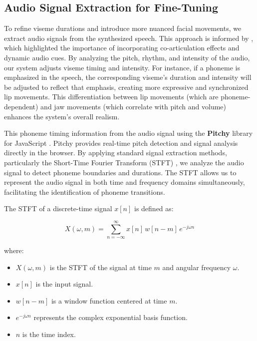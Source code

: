\documentclass[12pt]{article}
\begin{document}
\subsection{Audio Signal Extraction for Fine-Tuning}
To refine viseme durations and introduce more nuanced facial movements, we extract audio signals from the synthesized speech. This approach is informed by  \cite{Taylor2012DynamicSpeech}, which highlighted the importance of incorporating co-articulation effects and dynamic audio cues. By analyzing the pitch, rhythm, and intensity of the audio, our system adjusts viseme timing and intensity. For instance, if a phoneme is emphasized in the speech, the corresponding viseme's duration and intensity will be adjusted to reflect that emphasis, creating more expressive and synchronized lip movements. This differentiation between lip movements (which are phoneme-dependent) and jaw movements (which correlate with pitch and volume) enhances the system’s overall realism.

This phoneme timing information from the audio signal using the \textbf{Pitchy} library for JavaScript \cite{McLeod2005APitch}. Pitchy provides real-time pitch detection and signal analysis directly in the browser. By applying standard signal extraction methods, particularly the Short-Time Fourier Transform (STFT) \cite{Allen1977ASynthesis}, we analyze the audio signal to detect phoneme boundaries and durations. The STFT allows us to represent the audio signal in both time and frequency domains simultaneously, facilitating the identification of phoneme transitions.

The STFT of a discrete-time signal \( x[n] \) is defined as:

\[
X(\omega, m) = \sum_{n=-\infty}^{\infty} x[n] \, w[n - m] \, e^{-j \omega n}
\]

where:

\begin{itemize}
    \item \( X(\omega, m) \) is the STFT of the signal at time \( m \) and angular frequency \( \omega \).
    \item \( x[n] \) is the input signal.
    \item \( w[n - m] \) is a window function centered at time \( m \).
    \item \( e^{-j \omega n} \) represents the complex exponential basis function.
    \item \( n \) is the time index.
\end{itemize}
\end{document}
